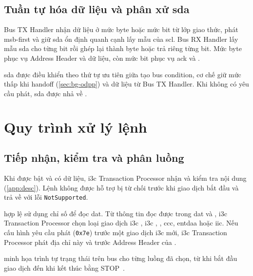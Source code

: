\subsection{Tuần tự hóa dữ liệu và phân xử \texorpdfstring{\gls{sda}}{SDA}}
\label{sec:rtl-txrx}
\label{sec:rtl-controller-active}

Bus TX Handler nhận dữ liệu ở mức byte hoặc mức bit từ lớp giao thức, phát \gls{msb}-first và giữ \gls{sda} ổn định quanh cạnh lấy mẫu của \gls{scl}. Bus RX Handler lấy mẫu \gls{sda} cho từng bit rồi ghép lại thành byte hoặc trả riêng từng bit. Mức byte phục vụ Address Header và dữ liệu, còn mức bit phục vụ \gls{ack} và \TBit{}.

\gls{sda} được điều khiển theo thứ tự ưu tiên giữa tạo bus condition, cơ chế giữ mức thấp khi handoff (\cref{sec:bg-odpp}) và dữ liệu từ Bus TX Handler. Khi không có yêu cầu phát, \gls{sda} được nhả về \OpenDrain{}.

\section{Quy trình xử lý lệnh}
\label{sec:rtl-flow-active}

\subsection{Tiếp nhận, kiểm tra và phân luồng}
\label{sec:flow-states}
\label{sec:flow-route}

Khi \Controller{} được bật và \CommandFifo{} có dữ liệu, \gls{i3c} Transaction Processor nhận và kiểm tra
nội dung \CommandDescriptor{} (\cref{app:desc}). Lệnh không được hỗ trợ bị từ chối trước khi
giao dịch bắt đầu và trả về \ResponseDescriptor{} với lỗi \texttt{NotSupported}.

\CommandDescriptor{} hợp lệ sử dụng chỉ số \Target{} để đọc \gls{dat}. Từ thông tin đọc được trong \gls{dat} và \CommandDescriptor{}, \gls{i3c} Transaction Processor chọn loại giao dịch \gls{i3c} \PrivateWrite{}, \gls{i3c} \PrivateRead{}, \ImmediateDataTransfer{}, \gls{ccc}, \gls{entdaa} hoặc \gls{iic}. Nếu cấu hình yêu cầu phát \IThreeCBroadcastAddress{} (\texttt{0x7e}) trước một giao dịch \gls{i3c} mới, \gls{i3c} Transaction Processor phát địa chỉ này và \RepeatedSTART{} trước Address Header của \Target{}.

 minh họa trình tự trạng thái trên bus cho từng luồng đã chọn, từ khi bắt đầu giao dịch đến khi kết thúc bằng STOP~\cite{mipi_i3c_basic}.

